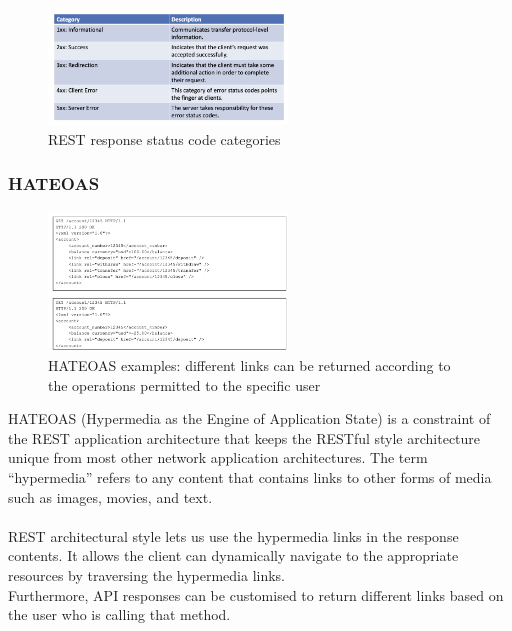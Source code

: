 \documentclass[10pt,a4paper]{article}
\begin{document}
\begin{figure}[ht!]
 \hfill \includegraphics[width=180pt]{images/rest-status}\hspace*{\fill}
 \caption{REST response status code categories}
  \label{fig:rest-status}
\end{figure}
\subsubsection{HATEOAS}
\begin{figure}[ht!]
 \hfill \includegraphics[width=180pt]{images/hateoas}\hspace*{\fill}
 \caption{HATEOAS examples: different links can be returned according to the operations permitted to the specific user}
  \label{fig:rest-status}
\end{figure} 
HATEOAS (Hypermedia as the Engine of Application State) is a constraint of the REST application architecture that keeps the RESTful style architecture unique from most other network application architectures. The term “hypermedia” refers to any content that contains links to other forms of media such as images, movies, and text.
\\ \\
REST architectural style lets us use the hypermedia links in the response contents. It allows the client can dynamically navigate to the appropriate resources by traversing the hypermedia links. \\
Furthermore, API responses can be customised to return different links based on the user who is calling that method.
\end{document}
